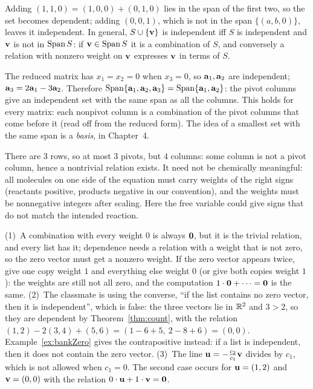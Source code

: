 \documentclass[11pt]{article}
\begin{document}
\begin{description}[leftmargin=0pt,itemsep=5pt]
  \item[Pause and think \ref{think:grow}.] Adding $(1,1,0)=(1,0,0)+(0,1,0)$ lies in the span of the first two, so the set becomes dependent; adding $(0,0,1)$, which is not in the span $\{(a,b,0)\}$, leaves it independent. In general, $S\cup\{\mathbf{v}\}$ is independent iff $S$ is independent and $\mathbf{v}$ is not in $\operatorname{Span} S$: if $\mathbf{v}\in\operatorname{Span} S$ it is a combination of $S$, and conversely a relation with nonzero weight on $\mathbf{v}$ expresses $\mathbf{v}$ in terms of $S$.
  \item[Pause and think \ref{think:pivotcols}.] The reduced matrix has $x_1=x_2=0$ when $x_3=0$, so $\mathbf{a}_1,\mathbf{a}_2$ are independent; $\mathbf{a}_3=2\mathbf{a}_1-3\mathbf{a}_2$. Therefore $\operatorname{Span}\{\mathbf{a}_1,\mathbf{a}_2,\mathbf{a}_3\}=\operatorname{Span}\{\mathbf{a}_1,\mathbf{a}_2\}$: the pivot columns give an independent set with the same span as all the columns. This holds for every matrix: each nonpivot column is a combination of the pivot columns that come before it (read off from the reduced form). The idea of a smallest set with the same span is a \emph{basis}, in Chapter~4.
  \item[Pause and think \ref{think:chem}.] There are $3$ rows, so at most $3$ pivots, but $4$ columns: some column is not a pivot column, hence a nontrivial relation exists. It need not be chemically meaningful: all molecules on one side of the equation must carry weights of the right signs (reactants positive, products negative in our convention), and the weights must be nonnegative integers after scaling. Here the free variable could give signs that do not match the intended reaction.
  \item[Pause and think \ref{think:habits}.] (1)~A combination with every weight $0$ is always $\mathbf{0}$, but it is the trivial relation, and every list has it; dependence needs a relation with a weight that is not zero, so the zero vector must get a nonzero weight. If the zero vector appears twice, give one copy weight $1$ and everything else weight $0$ (or give both copies weight $1$): the weights are still not all zero, and the computation $1\cdot\mathbf{0}+\cdots=\mathbf{0}$ is the same. (2)~The classmate is using the converse, ``if the list contains no zero vector, then it is independent'', which is false: the three vectors lie in $\mathbb{R}^2$ and $3>2$, so they are dependent by Theorem~\ref{thm:count}, with the relation $(1,2)-2(3,4)+(5,6)=(1-6+5,\ 2-8+6)=(0,0)$. Example~\ref{ex:bankZero} gives the contrapositive instead: if a list is independent, then it does not contain the zero vector. (3)~The line $\mathbf{u}=-\tfrac{c_2}{c_1}\mathbf{v}$ divides by $c_1$, which is not allowed when $c_1=0$. The second case occurs for $\mathbf{u}=(1,2)$ and $\mathbf{v}=(0,0)$ with the relation $0\cdot\mathbf{u}+1\cdot\mathbf{v}=\mathbf{0}$.

\end{description}
\end{document}
